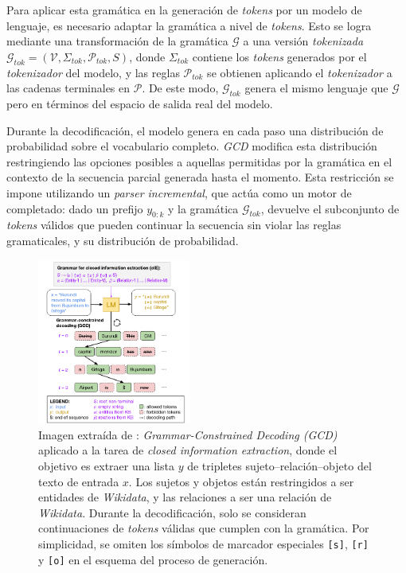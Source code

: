 Para aplicar esta gramática en la generación de \textit{tokens} por un modelo de lenguaje, es necesario adaptar la gramática a nivel de \textit{tokens}. Esto se logra mediante una transformación de la gramática $\mathcal{G}$ a una versión \textit{tokenizada} $\mathcal{G}_{\textit{tok}} = (\mathcal{V}, \Sigma_{\textit{tok}}, \mathcal{P}_{\textit{tok}}, S)$, donde $\Sigma_{\textit{tok}}$ contiene los \textit{tokens} generados por el \textit{tokenizador} del modelo, y las reglas $\mathcal{P}_{\textit{tok}}$ se obtienen aplicando el \textit{tokenizador} a las cadenas terminales en $\mathcal{P}$. De este modo, $\mathcal{G}_{\textit{tok}}$ genera el mismo lenguaje que $\mathcal{G}$ pero en términos del espacio de salida real del modelo.

Durante la decodificación, el modelo genera en cada paso una distribución de probabilidad sobre el vocabulario completo. \textit{GCD} modifica esta distribución restringiendo las opciones posibles a aquellas permitidas por la gramática en el contexto de la secuencia parcial generada hasta el momento. Esta restricción se impone utilizando un \textit{parser incremental}, que actúa como un motor de completado: dado un prefijo $y_{0:k}$ y la gramática $\mathcal{G}_{\textit{tok}}$, devuelve el subconjunto de \textit{tokens} válidos que pueden continuar la secuencia sin violar las reglas gramaticales, y su distribución de probabilidad.

\begin{figure}[H]
\centering
\includegraphics[width=0.45\textwidth]{Graphics/gcd.png}
\caption{Imagen extraída de \textcite{geng2023grammar}: \textit{Grammar-Constrained Decoding (GCD)} aplicado a la tarea de \textit{closed information extraction}, donde el objetivo es extraer una lista $y$ de tripletes sujeto–relación–objeto del texto de entrada $x$. Los sujetos y objetos están restringidos a ser entidades de \textit{Wikidata}, y las relaciones a ser una relación de \textit{Wikidata}. Durante la decodificación, solo se consideran continuaciones de \textit{tokens} válidas que cumplen con la gramática. Por simplicidad, se omiten los símbolos de marcador especiales \texttt{[s]}, \texttt{[r]} y \texttt{[o]} en el esquema del proceso de generación.}
\label{fig:domains}
\end{figure}

